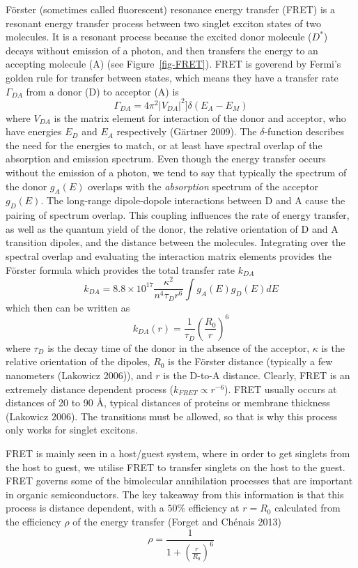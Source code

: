 \documentclass[
  letterpaper,
  DIV=11,
  numbers=noendperiod,
  oneside]{scrreprt}
\begin{document}
Förster (sometimes called fluorescent) resonance energy transfer (FRET)
is a resonant energy transfer process between two singlet exciton states
of two molecules. It is a resonant process because the excited donor
molecule (\(D^*\)) decays without emission of a photon, and then
transfers the energy to an accepting molecule (A) (see
Figure~\ref{fig-FRET}). FRET is goverend by Fermi's golden rule for
transfer between states, which means they have a transfer rate
\(\Gamma_{DA}\) from a donor (D) to acceptor (A) is
\[\Gamma_{DA} = 4\pi^2|V_{DA}|^2]\delta(E_A-E_M)\] where \(V_{DA}\) is
the matrix element for interaction of the donor and acceptor, who have
energies \(E_D\) and \(E_A\) respectively (Gärtner 2009). The
\(\delta\)-function describes the need for the energies to match, or at
least have spectral overlap of the absorption and emission spectrum.
Even though the energy transfer occurs without the emission of a photon,
we tend to say that typically the spectrum of the donor \(g_A(E)\)
overlaps with the \emph{absorption} spectrum of the acceptor \(g_D(E)\).
The long-range dipole-dopole interactions between D and A cause the
pairing of spectrum overlap. This coupling influences the rate of energy
transfer, as well as the quantum yield of the donor, the relative
orientation of D and A transition dipoles, and the distance between the
molecules. Integrating over the spectral overlap and evaluating the
interaction matrix elements provides the Förster formula which provides
the total transfer rate \(k_{DA}\)
\[k_{DA} = 8.8\times10^{17} \frac{\kappa^2}{n^4\tau_Dr^6}\int g_A(E)g_D(E)dE\]
which then can be written as
\[k_{DA}(r) = \frac{1}{\tau_D}\left(\frac{R_0}{r}\right)^6\] where
\(\tau_D\) is the decay time of the donor in the absence of the
acceptor, \(\kappa\) is the relative orientation of the dipoles, \(R_0\)
is the Förster distance (typically a few nanometers (Lakowicz 2006)),
and \(r\) is the D-to-A distance. Clearly, FRET is an extremely distance
dependent process (\(k_{FRET}\propto r^{-6}\)). FRET usually occurs at
distances of 20 to 90 Å, typical distances of proteins or membrane
thickness (Lakowicz 2006). The transitions must be allowed, so that is
why this process only works for singlet excitons.

FRET is mainly seen in a host/guest system, where in order to get
singlets from the host to guest, we utilise FRET to transfer singlets on
the host to the guest. FRET governs some of the bimolecular annihilation
processes that are important in organic semiconductors. The key takeaway
from this information is that this process is distance dependent, with a
\(50\%\) efficiency at \(r=R_0\) calculated from the efficiency \(\rho\)
of the energy transfer (Forget and Chénais 2013)
\[\rho = \frac{1}{1+\left(\frac{r}{R_0}\right)^6}\]
\end{document}
